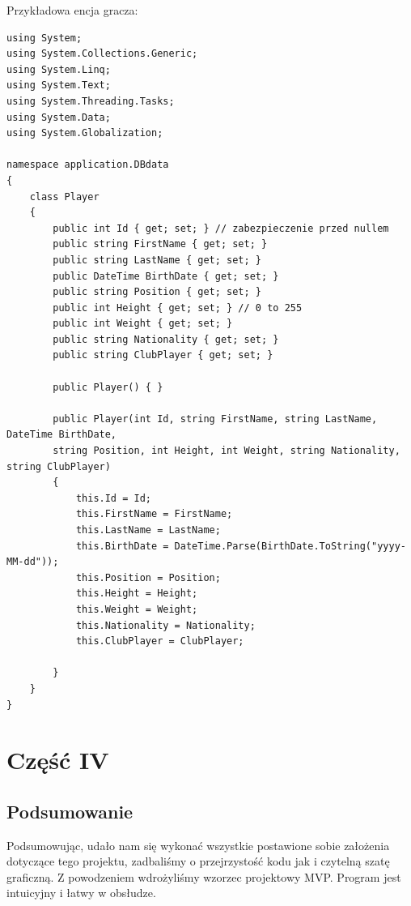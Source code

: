 \documentclass[12pt,a4paper]{article}
\begin{document}
    Przykładowa encja gracza:
    \begin{verbatim}
using System;
using System.Collections.Generic;
using System.Linq;
using System.Text;
using System.Threading.Tasks;
using System.Data;
using System.Globalization;

namespace application.DBdata
{
    class Player
    {
        public int Id { get; set; } // zabezpieczenie przed nullem
        public string FirstName { get; set; }
        public string LastName { get; set; }
        public DateTime BirthDate { get; set; }
        public string Position { get; set; }
        public int Height { get; set; } // 0 to 255
        public int Weight { get; set; }
        public string Nationality { get; set; }
        public string ClubPlayer { get; set; }

        public Player() { }

        public Player(int Id, string FirstName, string LastName, DateTime BirthDate,
        string Position, int Height, int Weight, string Nationality, string ClubPlayer)
        {
            this.Id = Id;
            this.FirstName = FirstName;
            this.LastName = LastName;
            this.BirthDate = DateTime.Parse(BirthDate.ToString("yyyy-MM-dd"));
            this.Position = Position;
            this.Height = Height;
            this.Weight = Weight;
            this.Nationality = Nationality;
            this.ClubPlayer = ClubPlayer;

        }
    }
}
    \end{verbatim}{}
    
    \section{Część IV}
    \subsection{Podsumowanie}
        Podsumowując, udało nam się wykonać wszystkie postawione sobie założenia dotyczące tego projektu, zadbaliśmy o przejrzystość kodu jak i czytelną szatę graficzną. Z powodzeniem wdrożyliśmy wzorzec projektowy MVP. Program jest intuicyjny i łatwy w obsłudze.
    
\end{document}
